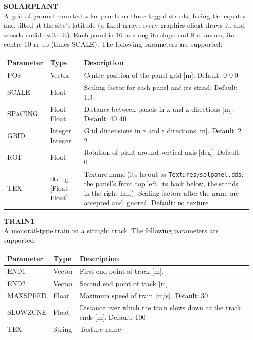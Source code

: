 \documentclass[Orbiter Developer Manual.tex]{subfiles}
\begin{document}
\noindent
\textbf{SOLARPLANT}\\
A grid of ground-mounted solar panels on three-legged stands, facing the equator and tilted at the site's latitude (a fixed array: every graphics client draws it, and vessels collide with it). Each panel is 16 m along its slope and 8 m across, its centre 10 m up (times SCALE). The following parameters are supported:

	\begin{longtable}{ |p{}|p{}|p{}| }
	\hline\rule{0pt}{2ex}
	\textbf{Parameter} & \textbf{Type} & \textbf{Description}\\
	\hline\rule{0pt}{2ex}
	POS & Vector & Centre position of the panel grid [m]. Default: 0 0 0\\
	\hline\rule{0pt}{2ex}
	SCALE & Float & Scaling factor for each panel and its stand. Default: 1.0\\
	\hline\rule{0pt}{2ex}
	SPACING & Float Float & Distance between panels in x and z directions [m]. Default: 40 40\\
	\hline\rule{0pt}{2ex}
	GRID & Integer Integer & Grid dimensions in x and z directions [m]. Default: 2 2\\
	\hline\rule{0pt}{2ex}
	ROT & Float & Rotation of plant around vertical axis [deg]. Default: 0\\
	\hline\rule{0pt}{2ex}
	TEX & String [Float Float] & Texture name (its layout as \texttt{Textures/solpanel.dds}: the panel's front top left, its back below, the stands in the right half). Scaling factors after the name are accepted and ignored. Default: no texture\\
	\hline
	\end{longtable}

\noindent
\textbf{TRAIN1}\\
A monorail-type train on a straight track. The following parameters are supported:

	\begin{longtable}{ |p{}|p{}|p{}| }
	\hline\rule{0pt}{2ex}
	\textbf{Parameter} & \textbf{Type} & \textbf{Description}\\
	\hline\rule{0pt}{2ex}
	END1 & Vector & First end point of track [m].\\
	\hline\rule{0pt}{2ex}
	END2 & Vector & Second end point of track [m].\\
	\hline\rule{0pt}{2ex}
	MAXSPEED & Float & Maximum speed of train [m/s]. Default: 30\\
	\hline\rule{0pt}{2ex}
	SLOWZONE & Float & Distance over which the train slows down at the track ends [m]. Default: 100\\
	\hline\rule{0pt}{2ex}
	TEX & String & Texture name\\
	\hline
	\end{longtable}
\end{document}
